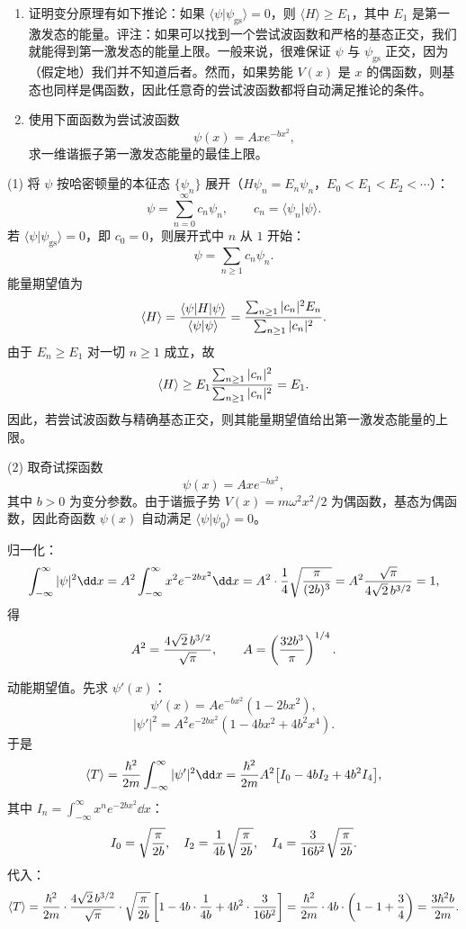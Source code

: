 \begin{question}
\begin{enumerate}
\item 证明变分原理有如下推论：如果 $\langle\psi|\psi_{\mathrm{gs}}\rangle=0$，则 $\langle H\rangle\ge E_1$，其中 $E_1$ 是第一激发态的能量。评注：如果可以找到一个尝试波函数和严格的基态正交，我们就能得到第一激发态的能量上限。一般来说，很难保证 $\psi$ 与 $\psi_{\mathrm{gs}}$ 正交，因为（假定地）我们并不知道后者。然而，如果势能 $V(x)$ 是 $x$ 的偶函数，则基态也同样是偶函数，因此任意奇的尝试波函数都将自动满足推论的条件。
\item 使用下面函数为尝试波函数
\[
\psi(x)=Axe^{-b x^2},
\]
求一维谐振子第一激发态能量的最佳上限。
\end{enumerate}
\end{question}
\begin{solution}
(1) 将 $\psi$ 按哈密顿量的本征态 $\{\psi_n\}$ 展开（$H\psi_n=E_n\psi_n$，$E_0<E_1<E_2<\cdots$）：
\[
\psi=\sum_{n=0}^\infty c_n\psi_n,\qquad c_n=\langle\psi_n|\psi\rangle.
\]
若 $\langle\psi|\psi_{\mathrm{gs}}\rangle=0$，即 $c_0=0$，则展开式中 $n$ 从 $1$ 开始：
\[
\psi=\sum_{n\ge1}c_n\psi_n.
\]
能量期望值为
\[
\langle H\rangle={\langle\psi|H|\psi\rangle\over\langle\psi|\psi\rangle}
={\sum_{n\ge1}|c_n|^2E_n\over\sum_{n\ge1}|c_n|^2}.
\]
由于 $E_n\ge E_1$ 对一切 $n\ge1$ 成立，故
\[
\langle H\rangle\ge E_1{\sum_{n\ge1}|c_n|^2\over\sum_{n\ge1}|c_n|^2}=E_1.
\]
因此，若尝试波函数与精确基态正交，则其能量期望值给出第一激发态能量的上限。

(2) 取奇试探函数
\[
\psi(x)=Axe^{-bx^2},
\]
其中 $b>0$ 为变分参数。由于谐振子势 $V(x)=m\omega^2x^2/2$ 为偶函数，基态为偶函数，因此奇函数 $\psi(x)$ 自动满足 $\langle\psi|\psi_0\rangle=0$。

归一化：
\[
\int_{-\infty}^\infty|\psi|^2\dd x
=A^2\int_{-\infty}^\infty x^2e^{-2bx^2}\dd x
=A^2\cdot{1\over4}\sqrt{\pi\over(2b)^3}
=A^2{\sqrt\pi\over4\sqrt2\,b^{3/2}}=1,
\]
得
\[
A^2={4\sqrt2\,b^{3/2}\over\sqrt\pi},\qquad
A=\left({32b^3\over\pi}\right)^{1/4}.
\]

动能期望值。先求 $\psi'(x)$：
\[
\psi'(x)=Ae^{-bx^2}(1-2bx^2),
\]
\[
|\psi'|^2=A^2e^{-2bx^2}(1-4bx^2+4b^2x^4).
\]
于是
\[
\langle T\rangle={\hbar^2\over2m}\int_{-\infty}^\infty|\psi'|^2\dd x
={\hbar^2\over2m}A^2\bigl[I_0-4bI_2+4b^2I_4\bigr],
\]
其中 $I_n=\int_{-\infty}^\infty x^n e^{-2bx^2}\dd x$：
\[
I_0=\sqrt{\pi\over2b},\quad
I_2={1\over4b}\sqrt{\pi\over2b},\quad
I_4={3\over16b^2}\sqrt{\pi\over2b}.
\]
代入：
\[
\langle T\rangle={\hbar^2\over2m}\cdot{4\sqrt2\,b^{3/2}\over\sqrt\pi}
\cdot\sqrt{\pi\over2b}\left[1-4b\cdot{1\over4b}+4b^2\cdot{3\over16b^2}\right]
={\hbar^2\over2m}\cdot4b\cdot\left(1-1+{3\over4}\right)
={3\hbar^2b\over2m}.
\]


\end{solution}
